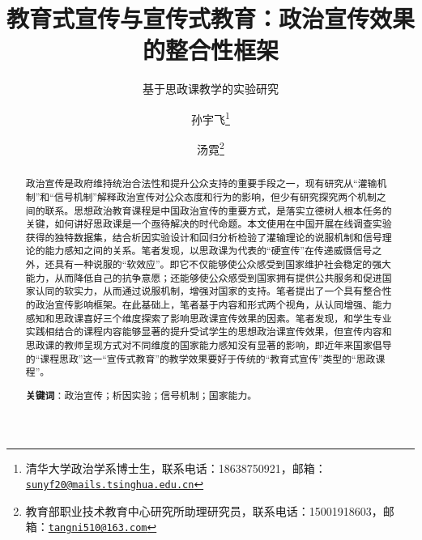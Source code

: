 \documentclass[
  12pt,
]{ctexart}
\title{教育式宣传与宣传式教育：政治宣传效果的整合性框架}
\subtitle{基于思政课教学的实验研究}
\author{孙宇飞\footnote{清华大学政治学系博士生，联系电话：18638750921，邮箱：\href{mailto:sunyf20@mails.tsinghua.edu.cn}{\nolinkurl{sunyf20@mails.tsinghua.edu.cn}}} \and 汤霓\footnote{教育部职业技术教育中心研究所助理研究员，联系电话：15001918603，邮箱：\href{mailto:tangni510@163.com}{\nolinkurl{tangni510@163.com}}}}
\date{}
\begin{document}
\maketitle
\begin{abstract}
政治宣传是政府维持统治合法性和提升公众支持的重要手段之一，现有研究从``灌输机制''和``信号机制''解释政治宣传对公众态度和行为的影响，但少有研究探究两个机制之间的联系。思想政治教育课程是中国政治宣传的重要方式，是落实立德树人根本任务的关键，如何讲好思政课是一个亟待解决的时代命题。本文使用在中国开展在线调查实验获得的独特数据集，结合析因实验设计和回归分析检验了灌输理论的说服机制和信号理论的能力感知之间的关系。笔者发现，以思政课为代表的``硬宣传''在传递威慑信号之外，还具有一种说服的``软效应''。即它不仅能够使公众感受到国家维护社会稳定的强大能力，从而降低自己的抗争意愿；还能够使公众感受到国家拥有提供公共服务和促进国家认同的软实力，从而通过说服机制，增强对国家的支持。笔者提出了一个具有整合性的政治宣传影响框架。在此基础上，笔者基于内容和形式两个视角，从认同增强、能力感知和思政课喜好三个维度探索了影响思政课宣传效果的因素。笔者发现，和学生专业实践相结合的课程内容能够显著的提升受试学生的思想政治课宣传效果，但宣传内容和思政课的教师呈现方式对不同维度的国家能力感知没有显著的影响，即近年来国家倡导的``课程思政''这一``宣传式教育''的教学效果要好于传统的``教育式宣传''类型的``思政课程''。

\textbf{关键词}：政治宣传；析因实验；信号机制；国家能力。
\end{abstract}
\end{document}
